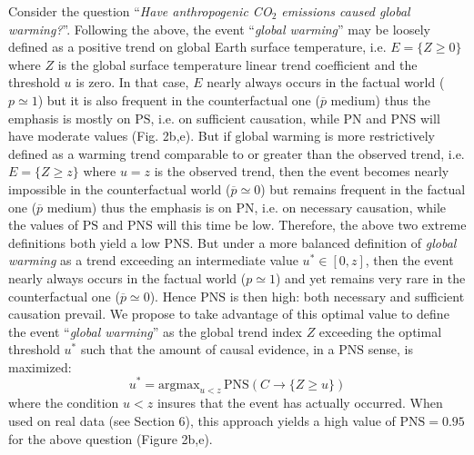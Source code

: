 \documentclass[12pt]{article}
\newcommand{\PNS}{\textrm{PNS}}
\begin{document}
Consider the question ``\textit{Have anthropogenic CO$_2$ emissions caused global warming?}''. Following the above, the event ``\textit{global warming}'' may be loosely defined as a positive trend on global Earth surface temperature, i.e. $E=\{Z\geq0\}$ where $Z$ is the global surface temperature linear trend coefficient and the threshold $u$ is zero. In that case, $E$ nearly always occurs in the factual world ($p\simeq 1$) but it is also frequent in the counterfactual one ($\overline{p}$ medium) 
thus the emphasis is mostly on $\textrm{PS}$, i.e. on sufficient causation, while $\textrm{PN}$ and $\textrm{PNS}$ will have moderate values (Fig. 2b,e). But if global warming is more restrictively defined as a warming trend comparable to or greater than the observed trend, i.e. $E=\{Z\geq z\}$ where $u=z$ is the observed trend, then the event becomes nearly impossible in the counterfactual world ($\overline{p}\simeq 0$) but remains frequent in the factual one ($\overline{p}$ medium) thus the emphasis is on $\textrm{PN}$, i.e. on necessary causation, while the values of $\textrm{PS}$ and $\textrm{PNS}$ will this time be low. Therefore, the above two extreme definitions both yield a low $\PNS$. But under a more balanced definition of \textit{global warming} as a trend exceeding an intermediate value $u^*\in[0,z]$, then the event nearly always occurs in the factual world ($p\simeq 1$) and yet remains very rare in the counterfactual one ($\overline{p}\simeq 0$). Hence $\textrm{PNS}$ is then high: both necessary and sufficient causation prevail. %
We propose to take advantage of this optimal value to define the event ``\textit{global warming}'' as the global trend index $Z$ exceeding the optimal threshold $u^*$ such that the amount of causal evidence, in a $\PNS$ sense, is maximized: 
\begin{equation}
\label{event1}
u^* = \textrm{argmax}_{u< z}\,\PNS(C\rightarrow \{Z\geq u\})
\end{equation}
where the condition $u< z$ insures that the event has actually occurred. %
When used on real data (see Section 6), this approach yields a high value of $\PNS=0.95$ for the above question (Figure 2b,e).
\end{document}
